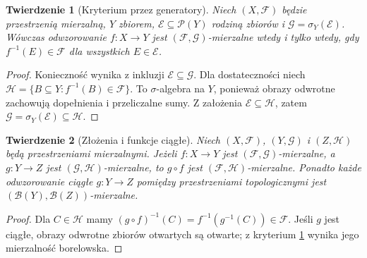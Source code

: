 \documentclass[11pt,a4paper,oneside]{book}
\numberwithin{equation}{chapter}
\theoremstyle{plain}
\newtheorem{twierdzenie}{Twierdzenie}[chapter]
\theoremstyle{definition}
\theoremstyle{remark}
\begin{document}
\begin{twierdzenie}[Kryterium przez generatory]
\label{thm:measurable-generator}
Niech $(X,\mathcal F)$ będzie przestrzenią mierzalną, $Y$ zbiorem,
$\mathcal E\subseteq\mathcal P(Y)$ rodziną zbiorów i
$\mathcal G=\sigma_Y(\mathcal E)$. Wówczas odwzorowanie
$f:X\to Y$ jest $(\mathcal F,\mathcal G)$-mierzalne wtedy i tylko
wtedy, gdy $f^{-1}(E)\in\mathcal F$ dla wszystkich $E\in\mathcal E$.
\end{twierdzenie}
\begin{proof}
Konieczność wynika z inkluzji $\mathcal E\subseteq\mathcal G$.
Dla dostateczności niech
$\mathcal H=\{B\subseteq Y:f^{-1}(B)\in\mathcal F\}$.
To $\sigma$-algebra na $Y$, ponieważ obrazy odwrotne zachowują
dopełnienia i przeliczalne sumy. Z założenia
$\mathcal E\subseteq\mathcal H$, zatem
$\mathcal G=\sigma_Y(\mathcal E)\subseteq\mathcal H$.
\end{proof}

\begin{twierdzenie}[Złożenia i funkcje ciągłe]
\label{thm:composition-measurable}
Niech $(X,\mathcal F)$, $(Y,\mathcal G)$ i $(Z,\mathcal H)$
będą przestrzeniami mierzalnymi. Jeżeli $f:X\to Y$ jest
$(\mathcal F,\mathcal G)$-mierzalne, a $g:Y\to Z$ jest
$(\mathcal G,\mathcal H)$-mierzalne, to $g\circ f$ jest
$(\mathcal F,\mathcal H)$-mierzalne.
Ponadto każde odwzorowanie ciągłe $g:Y\to Z$ pomiędzy
przestrzeniami topologicznymi jest
$(\mathcal B(Y),\mathcal B(Z))$-mierzalne.
\end{twierdzenie}
\begin{proof}
Dla $C\in\mathcal H$ mamy
$(g\circ f)^{-1}(C)=f^{-1}(g^{-1}(C))\in\mathcal F$.
Jeśli $g$ jest ciągłe, obrazy odwrotne zbiorów otwartych są otwarte;
z kryterium \ref{thm:measurable-generator} wynika jego mierzalność
borelowska.
\end{proof}
\end{document}
